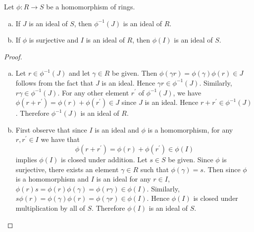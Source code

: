 \documentclass[10pt]{amsart}
\begin{document}
\begin{lem}\label{homid}
  Let $\phi \colon R \rightarrow S$ be a homomorphism of rings.
  \begin{enumerate}[(a)]
    \item
      If $J$ is an ideal of $S$, then $\phi^{-1}(J)$ is an ideal of $R$.
    \item
      If $\phi$ is surjective and $I$ is an ideal of $R$, then $\phi(I)$ is an ideal of $S$.
  \end{enumerate}
  \begin{proof}
    \begin{enumerate}[(a)]
    \item
      Let $r \in \phi^{-1}(J)$ and let $\gamma \in R$ be given.
      Then $\phi(\gamma r) = \phi(\gamma)\phi(r) \in J$ follows from the fact that $J$ is an ideal.
      Hence $\gamma r \in \phi^{-1}(J)$.
      Similarly, $r \gamma \in \phi^{-1}(J)$.
      For any other element $r^\prime$ of $\phi^{-1}(J)$, we have $\phi(r + r^\prime) = \phi(r) + \phi(r^\prime) \in J$ since $J$ is an ideal.
      Hence $r + r^\prime \in \phi^{-1}(J)$.
      Therefore $\phi^{-1}(J)$ is an ideal of $R$.
    \item
      First observe that since $I$ is an ideal and $\phi$ is a homomorphism, for any $r, r^\prime \in I$ we have that $$\phi(r + r^\prime) = \phi(r) + \phi(r^\prime) \in \phi(I)$$ implies $\phi(I)$ is closed under addition.
      Let $s \in S$ be given.
      Since $\phi$ is surjective, there exists an element $\gamma \in R$ such that $\phi(\gamma) = s$.
      Then since $\phi$ is a homomorphism and $I$ is an ideal for any $r \in I$, $\phi(r)s = \phi(r)\phi(\gamma) = \phi(r\gamma) \in \phi(I)$.
      Similarly, $ s\phi(r) = \phi(\gamma)\phi(r) = \phi(\gamma r) \in \phi(I)$.
      Hence $\phi(I)$ is closed under multiplication by all of $S$.
      Therefore $\phi(I)$ is an ideal of $S$.
    \end{enumerate}
  \end{proof}
\end{lem}
\end{document}
